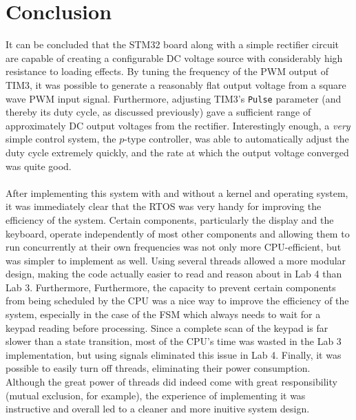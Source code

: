 \documentclass[12pt]{report}
\begin{document}
\section{Conclusion}
It can be concluded that the STM32 board along with a simple rectifier circuit are capable of
creating a configurable DC voltage source with considerably high resistance to loading effects. By
tuning the frequency of the PWM output of TIM3, it was possible to generate a reasonably flat output
voltage from a square wave PWM input signal. Furthermore, adjusting TIM3's \texttt{Pulse} parameter
(and thereby its duty cycle, as discussed previously) gave a sufficient range of approximately DC
output voltages from the rectifier. Interestingly enough, a \textit{very} simple control system, the
$p$-type controller, was able to automatically adjust the duty cycle extremely quickly, and the
rate at which the output voltage converged was quite good.\\\\
After implementing this system with and without a kernel and operating system, it was immediately
clear that the RTOS was very handy for improving the efficiency of the system. Certain components,
particularly the display and the keyboard, operate independently of most other components and
allowing them to run concurrently at their own frequencies was not only more CPU-efficient, but was
simpler to implement as well. Using several threads allowed a more modular design, making the code
actually easier to read and reason about in Lab 4 than Lab 3. Furthermore, Furthermore, the capacity
to prevent certain components from being scheduled by the CPU was a nice way to improve the
efficiency of the system, especially in the case of the FSM which always needs to wait for a keypad
reading before processing. Since a complete scan of the keypad is far slower than a state
transition, most of the CPU's time was wasted in the Lab 3 implementation, but using signals
eliminated this issue in Lab 4. Finally, it was possible to easily turn off threads, eliminating
their power consumption. Although the great power of threads did indeed come with great
responsibility (mutual exclusion, for example), the experience of implementing it was instructive
and overall led to a cleaner and more inuitive system design.
\newpage
\end{document}

